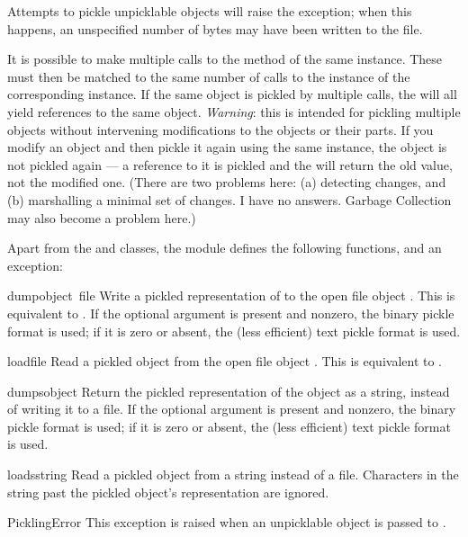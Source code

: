 Attempts to pickle unpicklable objects will raise the
 exception; when this happens, an unspecified
number of bytes may have been written to the file.

It is possible to make multiple calls to the  method of
the same  instance.  These must then be matched to the
same number of calls to the  instance of the
corresponding  instance.  If the same object is
pickled by multiple  calls, the  will all
yield references to the same object.  {\em Warning}: this is intended
for pickling multiple objects without intervening modifications to the
objects or their parts.  If you modify an object and then pickle it
again using the same  instance, the object is not
pickled again --- a reference to it is pickled and the
 will return the old value, not the modified one.
(There are two problems here: (a) detecting changes, and (b)
marshalling a minimal set of changes.  I have no answers.  Garbage
Collection may also become a problem here.)

Apart from the  and  classes, the
module defines the following functions, and an exception:

\begin{funcdesc}{dump}{object\, file}
Write a pickled representation of  to the open file object
.  This is equivalent to
.
If the optional  argument is present and nonzero, the binary
pickle format is used; if it is zero or absent, the (less efficient)
text pickle format is used.
\end{funcdesc}

\begin{funcdesc}{load}{file}
Read a pickled object from the open file object .  This is
equivalent to .
\end{funcdesc}

\begin{funcdesc}{dumps}{object}
Return the pickled representation of the object as a string, instead
of writing it to a file.  If the optional  argument is
present and nonzero, the binary pickle format is used; if it is zero
or absent, the (less efficient) text pickle format is used.
\end{funcdesc}

\begin{funcdesc}{loads}{string}
Read a pickled object from a string instead of a file.  Characters in
the string past the pickled object's representation are ignored.
\end{funcdesc}

\begin{excdesc}{PicklingError}
This exception is raised when an unpicklable object is passed to
.
\end{excdesc}
